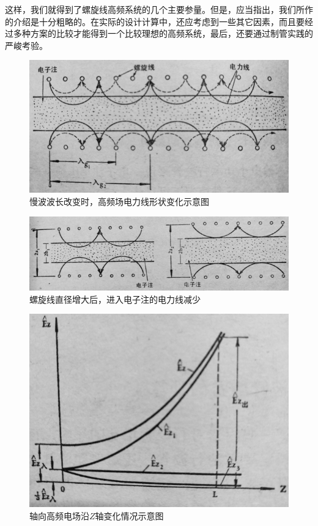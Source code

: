 这样，我们就得到了螺旋线高频系统的几个主要参量。但是，应当指出，我们所作的介绍是十分粗略的。在实际的设计计算中，还应考虑到一些其它因素，而且要经过多种方案的比较才能得到一个比较理想的高频系统，最后，还要通过制管实践的严峻考验。


\begin{figure}[phtb]
	\centering
	\includegraphics[width=0.65\linewidth]{figure/ch4-1}
	\caption{慢波波长改变时，高频场电力线形状变化示意图}
	\label{ch4-1}
\end{figure}

\begin{figure}[phtb]
	\centering
	\includegraphics[width=0.65\linewidth]{figure/ch4-2}
	\caption{螺旋线直径增大后，进入电子注的电力线减少}
	\label{ch4-2}
\end{figure}

\begin{figure}[phtb]
	\centering
	\includegraphics[width=0.65\linewidth]{figure/ch4-3}
	\caption{轴向高频电场沿$ Z $轴变化情况示意图}
	\label{ch4-3}
\end{figure}






